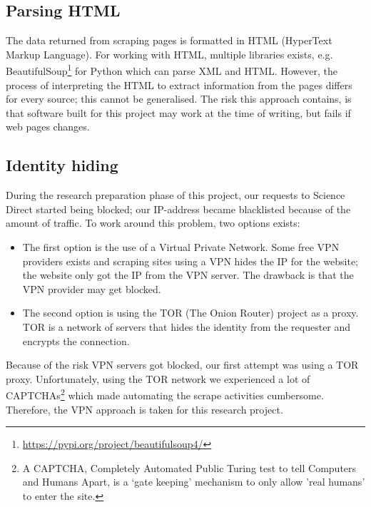 \documentclass{ou-report}
\begin{document}
\subsection{Parsing HTML}
\label{gen_impl:parsing_html}
The data returned from scraping pages is formatted in HTML (HyperText Markup 
Language). For working with
HTML, multiple libraries exists, e.g. 
BeautifulSoup\footnote{\url{https://pypi.org/project/beautifulsoup4/}} for 
Python which can parse XML and HTML.
%
However, the process of interpreting the HTML to extract information from the 
pages differs for every source; this cannot be generalised. 
The risk this approach contains, is that software built for this project may
work at the time of writing, but fails if web pages changes.
\subsection{Identity hiding}
During the research preparation phase of this project, our requests to 
Science Direct started being blocked; our IP-address became blacklisted because of the 
amount of traffic. To work around this problem, two options exists:

\begin{itemize}
\item The first option is the use of a Virtual Private Network. Some free VPN 
providers exists and scraping sites using a VPN hides the IP for the website; 
the website only got the IP from the VPN server. The drawback is that the VPN
provider may get blocked.

\item The second option is using the TOR (The Onion Router) project as a proxy. 
TOR is a network of 
servers that hides the identity from the requester and encrypts the 
connection.
\end{itemize}

Because of the risk VPN servers got blocked, our first attempt was using a TOR 
proxy. 
Unfortunately, using the TOR network we experienced a lot of CAPTCHAs\footnote{A 
CAPTCHA, Completely Automated Public Turing test to tell Computers and Humans Apart,
is a `gate keeping' mechanism to only allow 'real humans' to enter the site.} which 
made automating the scrape activities cumbersome.
Therefore, the VPN approach is taken for this research project.

\end{document}
